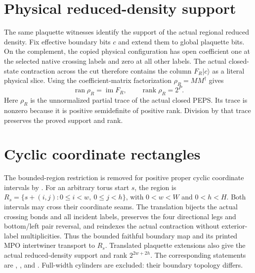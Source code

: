 \documentclass{article}
\begin{document}
\section{Physical reduced-density support}
The same plaquette witnesses identify the support of the actual regional
reduced density. Fix effective boundary bits $c$ and extend them to global
plaquette bits. On the complement, the copied physical configuration has
open coefficient one at the selected native crossing labels and zero at
all other labels. The actual closed-state contraction across the cut
therefore contains the column $F_R|c\rangle$ as a literal physical slice.
Using the coefficient-matrix factorization $\rho_R=MM^\dagger$ gives
\[
    \operatorname{ran}\rho_R=\operatorname{im}F_R,
    \qquad \operatorname{rank}\rho_R=2^P.
\]
Here $\rho_R$ is the unnormalized partial trace of the actual closed PEPS.
Its trace is nonzero because it is positive semidefinite of positive rank.
Division by that trace preserves the proved support and rank.

\section{Cyclic coordinate rectangles}
The bounded-region restriction is removed for positive proper cyclic
coordinate intervals by .
For an arbitrary torus start $s$, the region is
$R_s=\{s+(i,j):0\le i<w,\ 0\le j<h\}$, with $0<w<W$ and $0<h<H$.
Both intervals may cross their coordinate seams. The translation bijects
the actual crossing bonds and all incident labels, preserves the four
directional legs and bottom/left pair reversal, and reindexes the actual
contraction without exterior-label multiplicities. Thus the bounded
faithful boundary map and its printed MPO intertwiner transport to $R_s$.
Translated plaquette extensions also give the actual reduced-density
support and rank $2^{2w+2h}$. The corresponding statements are
,
, and
.
Full-width cylinders are excluded: their boundary topology differs.
\end{document}
